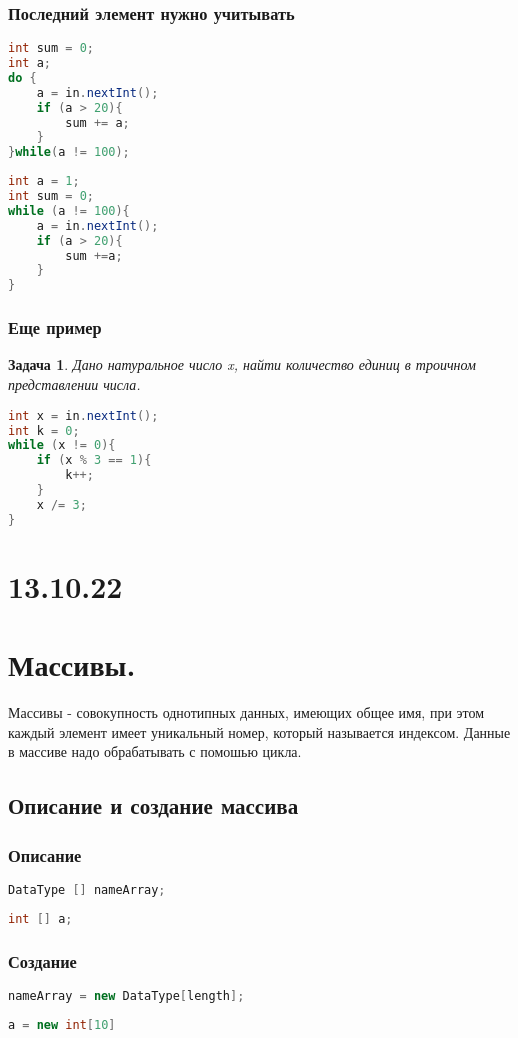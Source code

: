 \documentclass{scrartcl}
\newtheorem{task}{Задача}
\begin{document}
\subsubsection{Последний элемент нужно учитывать}
\begin{lstlisting}[language=Java] 
int sum = 0;
int a;
do {
    a = in.nextInt();
    if (a > 20){
        sum += a;
    }
}while(a != 100);
\end{lstlisting}
\begin{lstlisting}[language=Java] 
int a = 1;
int sum = 0;
while (a != 100){
    a = in.nextInt();
    if (a > 20){
        sum +=a;
    }
} 
\end{lstlisting}
\subsubsection{Еще пример}
\begin{task}
	Дано натуральное число x, найти количество единиц в троичном представлении числа.
\end{task}
\begin{lstlisting}[language=Java] 
int x = in.nextInt();
int k = 0;
while (x != 0){
    if (x % 3 == 1){
        k++;
    }
    x /= 3;
}
\end{lstlisting}
\section*{13.10.22}
\section{Массивы.}
Массивы - совокупность однотипных данных, имеющих общее имя, при этом каждый элемент имеет
уникальный номер, который называется индексом.
Данные в массиве надо обрабатывать с помошью цикла.
\subsection{Описание и создание массива}
\subsubsection{Описание}
\begin{lstlisting}[language=Java] 
DataType [] nameArray; 
\end{lstlisting}
\begin{lstlisting}[language=Java] 
int [] a; 
\end{lstlisting}
\subsubsection{Создание}
\begin{lstlisting}[language=Java] 
nameArray = new DataType[length]; 
\end{lstlisting}
\begin{lstlisting}[language=Java] 
a = new int[10] 
\end{lstlisting}
\end{document}
